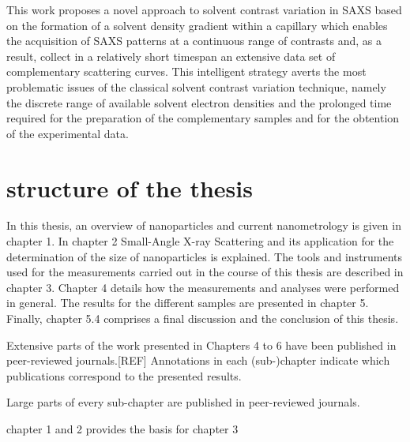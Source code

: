 This work proposes a novel approach to solvent contrast variation in SAXS based on the formation of a solvent density gradient within a capillary which enables the acquisition of SAXS patterns at a continuous range of contrasts and, as a result, collect in a relatively short timespan an extensive data set of complementary scattering curves. This intelligent strategy averts the most problematic issues of the classical solvent contrast variation technique, namely the discrete range of available solvent electron densities and the prolonged time required for the preparation of the complementary samples and for the obtention of the experimental data.


\section{structure of the thesis}

In this thesis, an overview of nanoparticles and current nanometrology is given in chapter 1. In chapter 2 Small-Angle X-ray Scattering and its application for the determination of the size of nanoparticles is explained. The tools and instruments used for the measurements carried out in the course of this thesis are described in chapter 3. Chapter 4 details how the measurements and analyses were performed
in general. The results for the different samples are presented in chapter 5. Finally, chapter 5.4 comprises a final discussion and the conclusion of this thesis.

Extensive parts of the work presented in Chapters 4 to 6 have been published in peer-reviewed journals.[REF] Annotations in each (sub-)chapter indicate which publications correspond to the presented results.

Large parts of every sub-chapter are published in peer-reviewed journals.

chapter 1 and 2 provides the basis for chapter 3


